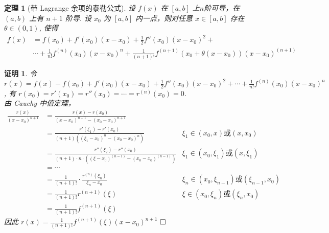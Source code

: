 \documentclass{ctexart}
\newcommand{\。}{．} %
\newenvironment{lanse}{
    \begin{tcolorbox}[enhanced, breakable, colback=qlan, boxrule=0pt, frame hidden,
        borderline west={0.7mm}{0.1mm}{slan}]
    }
    {\end{tcolorbox}}
\newenvironment{huangse}{
    \begin{tcolorbox}[enhanced, breakable, colback=qhuang, boxrule=0pt, frame hidden,
        borderline west={0.7mm}{0.1mm}{shuang}]
    }
    {\end{tcolorbox}}
\theoremstyle{t} %
\newtheorem{dlhj}{\color{shuang} 定理}[subsection]
\newtheorem*{zmhj}{\color{slan} 证明}
\newenvironment{zm}{\begin{lanse}\begin{zmhj}}{$\hfill \square$\end{zmhj}\end{lanse}}
\newenvironment{dl}{\begin{huangse}\begin{dlhj}}{\end{dlhj}\end{huangse}}
\begin{document}
\begin{dl}[带 Lagrange 余项的泰勒公式]
    设 $f(x)$ 在 $[a, b]$ 上$n$阶可导，在 $(a, b)$ 上有 $n + 1$ 阶导. 设 $x_0$ 为 $[a, b]$ 内一点，则对任意 $x \in [a, b]$ 存在 $\theta \in (0, 1)$, 使得
    \begin{align*}
        f(x) & = f(x_0) + f'(x_0)(x - x_0) + \frac{1}{2}f''(x_0)(x - x_0)^2 +  \\
        & \cdots + \frac{1}{n!}f^{(n)}(x_0)(x - x_0)^n + \frac{1}{(n + 1)!}f^{(n + 1)}(x_0 + \theta(x - x_0))(x - x_0)^{(n + 1)}
    \end{align*}
\end{dl}

\begin{zm}
    令 $r(x) = f(x) - f(x_0) + f'(x_0)(x - x_0) + \frac{1}{2}f''(x_0)(x - x_0)^2 + \cdots + \frac{1}{n!}f^{(n)}(x_0)(x - x_0)^n$, 有 $r(x_0) = r'(x_0) = r''(x_0) = \cdots = r^{(n)}(x_0) = 0$. \\
    由 Cauchy 中值定理，
    \begin{align*}
        \frac{r(x)}{(x - x_0)^{n + 1}} & = \frac{r(x) - r(x_0)}{(x - x_0)^{n + 1} - (x_0 - x_0)^{n + 1}} \\
        & = \frac{r'(\xi_1) - r'(x_0)}{(n + 1)((\xi_1 - x_0)^n - (x_0 - x_0)^n)} & \xi_1 \in (x_0, x) \text{或} (x, x_0) \\
        & =  \frac{r''(\xi_2) - r''(x_0)}{(n + 1)\cdot n\cdot ((\xi - x_0)^{(n - 1)} - (x_0 - x_0)^{(n - 1)})} & \xi_1 \in (x_0, \xi_1) \text{或} (x, \xi_1) \\
        & = \cdots \\
        & = \frac{1}{(n + 1)!}\cdot \frac{r^{(n)}(\xi_n)}{\xi_n - x_0} & \xi_n \in (x_0, \xi_{n - 1}) \text{或} (\xi_{n - 1}, x_0) \\
        & = \frac{1}{(n + 1)!}r^{(n + 1)}(\xi) & \xi \in (x_0, \xi_{n}) \text{或} (\xi_{n}, x_0) \\
        & = \frac{1}{(n + 1)!}f^{(n + 1)}(\xi)
    \end{align*}
    因此 $r(x) = \frac{1}{(n + 1)!}f^{(n + 1)}(\xi)(x - x_0)^{n + 1}$  
\end{zm}
\end{document}

